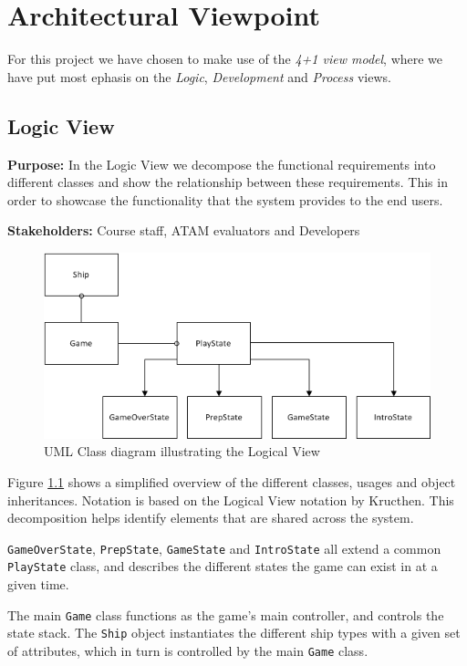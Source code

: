 \chapter{Architectural Viewpoint}
For this project we have chosen to make use of the \emph{4+1 view model}, where we have put most ephasis on the \emph{Logic}, \emph{Development} and \emph{Process} views.

    \section{Logic View}
    \textbf{Purpose:} In the Logic View we decompose the functional requirements into different classes and show the relationship between these requirements. This in order to showcase the functionality that the system provides to the end users.

    
    
    \noindent\textbf{Stakeholders:} Course staff, ATAM evaluators and Developers 
    
    
    \begin{figure}[h]
        \includegraphics[width=\textwidth]{LogicalView.png}
        \caption{UML Class diagram illustrating the Logical View}
        \label{fig:LogicalView}
    \end{figure}


    Figure \ref{fig:LogicalView} shows a simplified overview of the different classes, usages and object inheritances. Notation is based on the Logical View notation by Kructhen\cite{kruchten}. This decomposition helps identify elements that are shared across the system.

    \texttt{GameOverState}, \texttt{PrepState}, \texttt{GameState} and \texttt{IntroState} all extend a common \texttt{PlayState} class, and describes the different states the game can exist in at a given time.

    The main \texttt{Game} class functions as the game's main controller, and controls the state stack. The \texttt{Ship} object instantiates the different ship types with a given set of attributes, which in turn is controlled by the main \texttt{Game} class.

